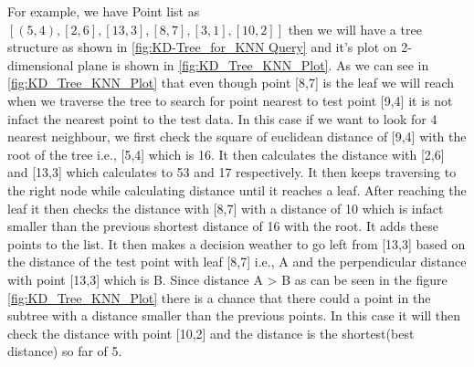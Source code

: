 \begin{mscexample}
	For example, we have Point list as $[(5,4),[2,6],[13,3],[8,7],[3,1],[10,2]]$ then we will have a tree structure as shown in \ref{fig:KD-Tree_for_KNN Query} and it's plot on 2-dimensional plane is shown in \ref{fig:KD_Tree_KNN_Plot}. As we can see in \ref{fig:KD_Tree_KNN_Plot} that even though point [8,7] is the leaf we will reach when we traverse the tree to search for point nearest to test point [9,4] it is not infact the nearest point to the test data. In this case if we want to look for 4 nearest neighbour, we first check the square of euclidean distance of [9,4] with the root of the tree i.e., [5,4] which is 16. It then calculates the distance with [2,6] and [13,3] which calculates to 53 and 17 respectively. It then keeps traversing to the right node while calculating distance until it reaches a leaf. After reaching the leaf it then checks the distance with [8,7] with a distance of 10 which is infact smaller than the previous shortest distance of 16 with the root. It adds these points to the list. It then makes a decision weather to go left from [13,3] based on the distance of the test point with leaf [8,7] i.e., A and the perpendicular distance with point [13,3] which is B. Since distance A > B as can be seen in the figure \ref{fig:KD_Tree_KNN_Plot} there is a chance that there could a point in the subtree with a distance smaller than the previous points. In this case it will then check the distance with point [10,2] and the distance is the shortest(best distance) so far of 5. 
\end{mscexample}

